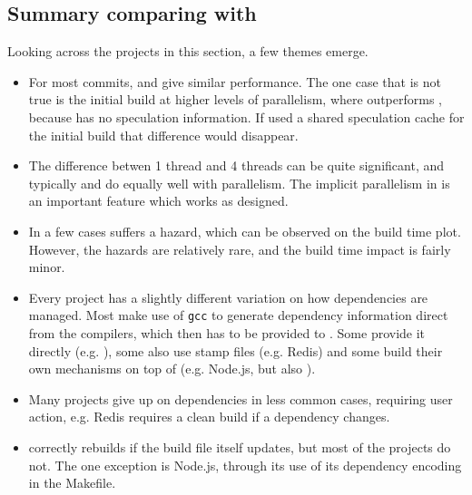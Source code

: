 



\subsection{Summary comparing with \Make}

Looking across the projects in this section, a few themes emerge.

\begin{itemize}
\item For most commits, \Rattle and \Make give similar performance. The one case that is not true is the initial build at higher levels of parallelism, where \Make outperforms \Rattle, because \Rattle has no speculation information. If \Rattle used a shared speculation cache for the initial build that difference would disappear.
\item The difference betwen 1 thread and 4 threads can be quite significant, and typically \Make and \Rattle do equally well with parallelism. The implicit parallelism in \Rattle is an important feature which works as designed.
\item In a few cases \Rattle suffers a hazard, which can be observed on the build time plot. However, the hazards are relatively rare, and the build time impact is fairly minor.
\item Every \Make project has a slightly different variation on how dependencies are managed. Most make use of \texttt{gcc} to generate dependency information direct from the compilers, which then has to be provided to \Make. Some provide it directly (e.g. \Fsatrace), some also use stamp files (e.g. Redis) and some build their own mechanisms on top of \Make (e.g. Node.js, but also \citet[\S2]{hadrian}).
\item Many projects give up on dependencies in less common cases, requiring user action, e.g. Redis requires a clean build if a dependency changes.
\item \Rattle correctly rebuilds if the build file itself updates, but most of the \Make projects do not. The one exception is Node.js, through its use of its dependency encoding in the Makefile.
\end{itemize}


